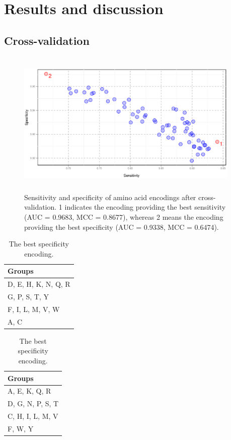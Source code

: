 \documentclass[fleqn,10pt,twoside]{gcb15submission}
\begin{document}
\section*{Results and discussion}

\subsection*{Cross-validation}

\begin{figure}[ht]\centering
\includegraphics[width=0.95\textwidth, height=7cm]{figures/cvres.eps}
\caption{Sensitivity and specificity of amino acid encodings after cross-validation. 1 indicates the encoding providing the best sensitivity (AUC = 0.9683, MCC = 0.8677), whereas 2 means the encoding providing the best specificity (AUC = 0.9338, MCC = 0.6474).}
\label{fig:cvres}
\end{figure}

\begin{table}[ht]
\small
\begin{minipage}{.5\linewidth} 
\centering
\caption{The best sensitivity (final) encoding.} 
\begin{tabular}{l}
  \toprule
Groups \\ 
  \midrule
D, E, H, K, N, Q, R \\ 
   \rowcolor[gray]{0.85}G, P, S, T, Y \\ 
  F, I, L, M, V, W \\ 
   \rowcolor[gray]{0.85}A, C \\ 
   \bottomrule
\end{tabular}
\label{tab:best}
\end{minipage}
\begin{minipage}{.5\linewidth} 
\centering
\caption{The best specificity encoding.} 
\begin{tabular}{l}
  \toprule
Groups \\ 
  \midrule
A, E, K, Q, R \\ 
   \rowcolor[gray]{0.85}D, G, N, P, S, T \\ 
  C, H, I, L, M, V \\ 
   \rowcolor[gray]{0.85}F, W, Y \\ 
   \bottomrule
\end{tabular}
\label{tab:worst}
\end{minipage}
\end{table}
\end{document}
